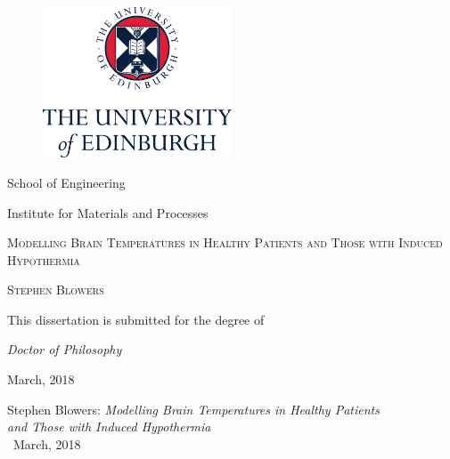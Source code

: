 \documentclass[11pt,english,a4paper,twoside,openright]{report}
\begin{document}
	
		
	
	\begin{titlepage}
		\begin{center}
		\vspace{2cm}
		\begin{figure}
			\centering
			\includegraphics[width=0.5\textwidth]{UniversityLogo}
		\end{figure}
		\Large 
		School of Engineering
		
		Institute for Materials and Processes
		
		\makebox[0.9\textwidth]{\titlerule[0.2ex]}
		
		{\selectfont\textsc{Modelling Brain Temperatures in Healthy Patients and Those with Induced Hypothermia}}
		
		\vspace{2cm}
		
		{\selectfont\textsc{Stephen Blowers}}
		
		\vspace{2cm}
		
		This dissertation is submitted for the degree of 
		
		\textit{Doctor of Philosophy}
		
		March, 2018
		
		\end{center}
	\end{titlepage}
	
	\thispagestyle{empty}
	
	\null
	
	\vfill
	\noindent
	Stephen Blowers: \textit{Modelling Brain Temperatures in Healthy Patients\\ and Those with Induced Hypothermia} \\
	\textcopyright~March, 2018
	
	\medskip
	
\end{document}
